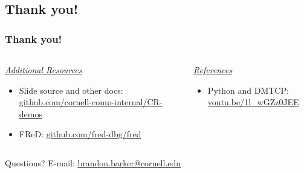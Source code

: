 \documentclass[compress]{beamer}
\begin{document}

\subsection{Thank you!}
\begin{frame}
\frametitle{Thank you!} 

\begin{columns}[t]
%
\begin{column}{0.5\textwidth}
\ul{\textit{Additional Resources}}
\begin{itemize}
\item Slide source and other docs: \url{github.com/cornell-comp-internal/CR-demos}
\item FReD: \url{github.com/fred-dbg/fred}
\end{itemize}
\end{column}

\begin{column}{0.5\textwidth}
\ul{\textit{References}}
\begin{itemize}
\item Python and DMTCP: \url{youtu.be/1l_wGZz0JEE}
\end{itemize}

\vspace{0.4in}


\end{column}

%
\end{columns}

\vspace{0.4in}
Questions? E-mail: \url{brandon.barker@cornell.edu}
\end{frame}

  


\end{document}
